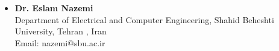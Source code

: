 \documentclass[10pt]{res}
\begin{document}
\begin{resume}
\begin{itemize}
\item   {\bf  Dr. Eslam Nazemi}\\
Department of Electrical and Computer Engineering, Shahid Beheshti University, Tehran , Iran\\
Email: nazemi@sbu.ac.ir


\end{itemize}

\end{resume}
\end{document}
